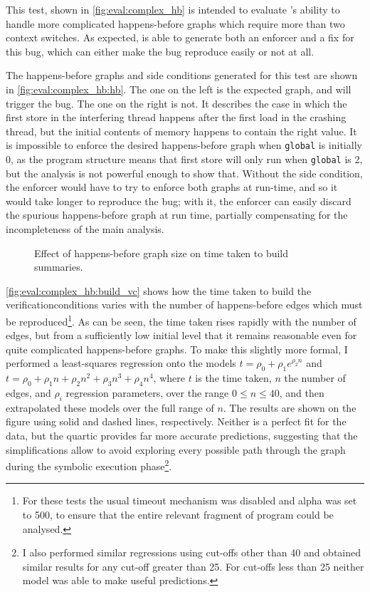 This test, shown in \autoref{fig:eval:complex_hb} is intended to
evaluate {\technique}'s ability to handle more complicated
happens-before graphs which require more than two context switches.
As expected, {\implementation} is able to generate both an enforcer
and a fix for this bug, which can either make the bug reproduce easily
or not at all.

The happens-before graphs and side conditions generated for this test
are shown in \autoref{fig:eval:complex_hb:hb}.  The one on the left
is the expected graph, and will trigger the bug.  The one on the right
is not.  It describes the case in which the first store in the
interfering thread happens after the first load in the crashing
thread, but the initial contents of memory happens to contain the
right value.  It is impossible to enforce the desired happens-before
graph when \texttt{global} is initially 0, as the program structure
means that first store will only run when \texttt{global} is 2, but
the {\technique} analysis is not powerful enough to show that.
Without the side condition, the enforcer would have to try to enforce
both graphs at run-time, and so it would take longer to reproduce the
bug; with it, the enforcer can easily discard the spurious
happens-before graph at run time, partially compensating for the
incompleteness of the main analysis.

\begin{figure}
  \centerline{}
  \caption{Effect of happens-before graph size on time taken to build
    summaries. \label{fig:eval:complex_hb:build_vc}}
\end{figure}

\autoref{fig:eval:complex_hb:build_vc} shows how the time taken to
build the \glspl{verificationcondition} varies with the number of
happens-before edges which must be reproduced\footnote{For these tests
  the usual timeout mechanism was disabled and \gls{alpha} was set to
  500, to ensure that the entire relevant fragment of program could be
  analysed.}.  As can be seen, the time taken rises rapidly with the
number of edges, but from a sufficiently low initial level that it
remains reasonable even for quite complicated happens-before graphs.
To make this slightly more formal, I performed a least-squares
regression onto the models $t = {\rho_0} + {\rho_1}e^{{\rho_2}n}$ and
$t = \rho_0 + \rho_1n + \rho_2n^2 + \rho_3n^3 + \rho_4n^4$, where $t$
is the time taken, $n$ the number of edges, and $\rho_i$ regression
parameters, over the range $0 \leq n \leq 40$, and then extrapolated
these models over the full range of $n$.  The results are shown on the
figure using solid and dashed lines, respectively.  Neither is a
perfect fit for the data, but the quartic provides far more accurate
predictions, suggesting that the {\StateMachine} simplifications allow
{\technique} to avoid exploring every possible path through the graph
during the symbolic execution phase\footnote{I also performed similar
  regressions using cut-offs other than 40 and obtained similar
  results for any cut-off greater than 25.  For cut-offs less than 25
  neither model was able to make useful predictions.}.

